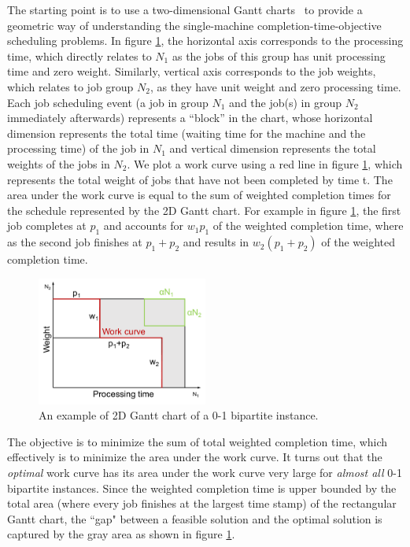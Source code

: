 The starting point is to use a two-dimensional Gantt charts~\cite{eastman1964bounds} to provide a geometric way of understanding the single-machine completion-time-objective scheduling problems. In figure \ref{fig:gantt}, the horizontal axis corresponds to the processing time, which directly relates to $N_1$ as the jobs of this group has unit processing time and zero weight. Similarly, vertical axis corresponds to the job weights, which relates to job group $N_2$, as they have unit weight and zero processing time. Each job scheduling event (a job in group $N_1$ and the job(s) in group $N_2$ immediately afterwards) represents a ``block'' in the chart, whose horizontal dimension represents the total time (waiting time for the machine and the processing time) of the job in $N_1$ and vertical dimension represents the total weights of the jobs in $N_2$. We plot a work curve using a red line in figure \ref{fig:gantt}, which represents the total weight of jobs that have not been completed by time t. The area under the work curve is equal to the sum of weighted completion times for the schedule represented by the 2D Gantt chart. For example in figure \ref{fig:gantt}, the first job completes at $p_1$ and accounts for $w_1p_1$ of the weighted completion time, where as the second job finishes at $p_1 + p_2$ and results in $w_2(p_1+p_2)$ of the weighted completion time. 
\begin{figure}[h]
	\centering
	\includegraphics[width=0.5\textwidth]{figs/gantt.pdf}
	\caption{An example of 2D Gantt chart of a 0-1 bipartite instance.}
	\label{fig:gantt}
\end{figure}

The objective is to minimize the sum of total weighted completion time, which effectively is to minimize the area under the work curve. It turns out that the \emph{optimal} work curve has its area under the work curve very large for \emph{almost all} 0-1 bipartite instances. Since the weighted completion time is upper bounded by the total area (where every job finishes at the largest time stamp) of the rectangular Gantt chart, the ``gap" between a feasible solution and the optimal solution is captured by the gray area as shown in figure \ref{fig:gantt}.


